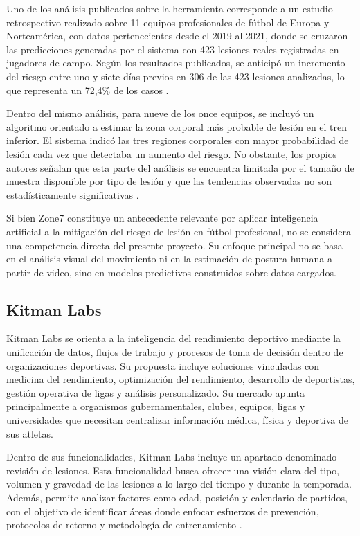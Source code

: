Uno de los análisis publicados sobre la herramienta corresponde a un estudio retrospectivo
realizado sobre 11 equipos profesionales de fútbol de Europa y Norteamérica, con datos
pertenecientes desde el 2019 al 2021, donde se cruzaron las predicciones generadas por el
sistema con 423 lesiones reales registradas en jugadores de campo. Según los resultados
publicados, se anticipó un incremento del riesgo entre uno y siete días previos en 306 de
las 423 lesiones analizadas, lo que representa un 72,4\% de los casos
\parencite{Zone7ValidationStudy}.

Dentro del mismo análisis, para nueve de los once equipos, se incluyó un algoritmo orientado
a estimar la zona corporal más probable de lesión en el tren inferior. El sistema indicó las
tres regiones corporales con mayor probabilidad de lesión cada vez que detectaba un aumento
del riesgo. No obstante, los propios autores señalan que esta parte del análisis se encuentra
limitada por el tamaño de muestra disponible por tipo de lesión y que las tendencias
observadas no son estadísticamente significativas \parencite{Zone7ValidationStudy}.

Si bien Zone7 constituye un antecedente relevante por aplicar inteligencia artificial a la
mitigación del riesgo de lesión en fútbol profesional, no se considera una competencia
directa del presente proyecto. Su enfoque principal no se basa en el análisis visual del
movimiento ni en la estimación de postura humana a partir de video, sino en modelos
predictivos construidos sobre datos cargados.

\subsection{Kitman Labs}

Kitman Labs \parencite{KitmanLabsSitio} se orienta a la inteligencia del rendimiento
deportivo mediante la unificación de datos, flujos de trabajo y procesos de toma de
decisión dentro de organizaciones deportivas. Su propuesta incluye soluciones vinculadas
con medicina del rendimiento, optimización del rendimiento, desarrollo de deportistas,
gestión operativa de ligas y análisis personalizado. Su mercado apunta principalmente a
organismos gubernamentales, clubes, equipos, ligas y universidades que necesitan centralizar
información médica, física y deportiva de sus atletas.

Dentro de sus funcionalidades, Kitman Labs incluye un apartado denominado revisión de
lesiones. Esta funcionalidad busca ofrecer una visión clara del tipo, volumen y gravedad de
las lesiones a lo largo del tiempo y durante la temporada. Además, permite analizar factores
como edad, posición y calendario de partidos, con el objetivo de identificar áreas donde
enfocar esfuerzos de prevención, protocolos de retorno y metodología de entrenamiento
\parencite{KitmanLabsAnalisisPersonalizados}.

